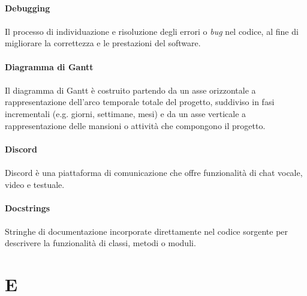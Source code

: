 \documentclass[10pt, a4paper]{article}
\begin{document}
\vspace{2em}
\paragraph{Debugging}\noindent\hrulefill
\paragraph{}Il processo di individuazione e risoluzione degli errori o \textit{bug\pg} nel codice, al fine di migliorare la correttezza e le prestazioni del software.


\vspace{2em}
\paragraph{Diagramma di Gantt}\noindent\hrulefill
\paragraph{}Il diagramma di Gantt è costruito partendo da un asse orizzontale a rappresentazione dell’arco temporale
totale del progetto, suddiviso in fasi incrementali (e.g. giorni, settimane, mesi) e da un asse
verticale a rappresentazione delle mansioni o attività che compongono il progetto.

\vspace{2em}
\paragraph{Discord}\noindent\hrulefill
\paragraph{}Discord è una piattaforma di comunicazione che offre funzionalità di chat vocale, video e testuale.

\vspace{2em}
\paragraph{Docstrings}\noindent\hrulefill
\paragraph{}Stringhe di documentazione incorporate direttamente nel codice sorgente per descrivere la funzionalità di classi, metodi o moduli.



\newpage
\section{E}
\vspace{2em}
\end{document}

